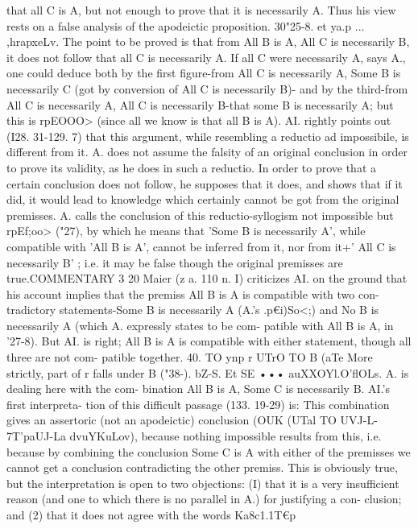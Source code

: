 {that all C is A, but not enough to prove that it is necessarily A.
Thus his view rests on a false analysis of the apodeictic proposition.
30"25-8. et ya.p ... ,hrapxeLv. The point to be proved is that
from All B is A, All C is necessarily B, it does not follow that all
C is necessarily A. If all C were necessarily A, says A., one could
deduce both by the first figure-from All C is necessarily A, Some
B is necessarily C (got by conversion of All C is necessarily B)-
and by the third-from All C is necessarily A, All C is necessarily
B-that some B is necessarily A; but this is rpEOOO> (since all
we know is that all B is A).
AI. rightly points out (I28. 31-129. 7) that this argument,
while resembling a reductio ad impossibile, is different from it.
A. does not assume the falsity of an original conclusion in order
to prove its validity, as he does in such a reductio. In order to
prove that a certain conclusion does not follow, he supposes that
it does, and shows that if it did, it would lead to knowledge which
certainly cannot be got from the original premisses. A. calls the
conclusion of this reductio-syllogism not impossible but rpEf;oo>
("27), by which he means that 'Some B is necessarily A', while
compatible with 'All B is A', cannot be inferred from it, nor
from it+' All C is necessarily B' ; i.e. it may be false though the
original premisses are true.COMMENTARY
3 20
Maier (z a. 110 n. I) criticizes AI. on the ground that his account
implies that the premiss All B is A is compatible with two con-
tradictory statements-Some B is necessarily A (A.'s .p€i)So<;)
and No B is necessarily A (which A. expressly states to be com-
patible with All B is A, in '27-8). But AI. is right; All B is A is
compatible with either statement, though all three are not com-
patible together.
40. TO ynp r UTrO TO B (aTe More strictly, part of r falls under
B ("38-{}).
bZ-S. Et SE ••• auXXOYl.O'flOLs. A. is dealing here with the com-
bination All B is A, Some C is necessarily B. AI.'s first interpreta-
tion of this difficult passage (133. 19-29) is: This combination gives
an assertoric (not an apodeictic) conclusion (OUK (UTal TO UVJ-L-
7T'paUJ-La dvuYKuLov), because nothing impossible results from this,
i.e. because by combining the conclusion Some C is A with either
of the premisses we cannot get a conclusion contradicting the
other premiss. This is obviously true, but the interpretation is
open to two objections: (I) that it is a very insufficient reason
(and one to which there is no parallel in A.) for justifying a con-
clusion; and (2) that it does not agree with the words Ka8c1.1T€p
}
